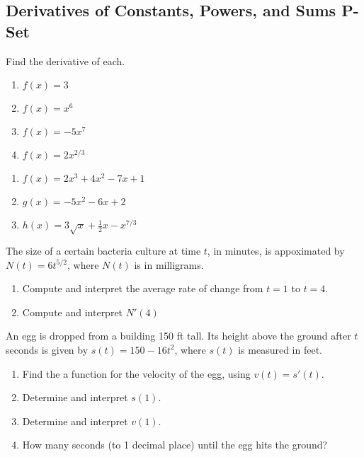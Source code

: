 \documentclass{article}
\newcounter{pset}
\begin{document}
\subsection*{Derivatives of Constants, Powers, and Sums P-Set}

Find the derivative of each.
\begin{multicols}{4}
\begin{enumerate}
    \item $f(x) = 3$
    \item $f(x) = x^6$
    \item $f(x) = -5x^7$
    \item $f(x) = 2x^{2/3}$
\end{enumerate}     \setcounter{pset}{\value{enumi}}
\end{multicols}
\begin{multicols}{3}
\begin{enumerate}   \setcounter{enumi}{\value{pset}}
    \item $f(x) = 2x^3 + 4x^2 - 7x + 1$
    \item $g(x) = -5x^2 - 6x + 2$
    \item $h(x) = 3\sqrt{x} + \frac{1}{2}x - x^{7/3}$
\end{enumerate}     \setcounter{pset}{\value{enumi}}
\end{multicols}

The size of a certain bacteria culture at time $t$, in minutes, is appoximated by $N(t) = 6t^{5/2}$, where $N(t)$ is in milligrams.
\begin{enumerate}   \setcounter{enumi}{\value{pset}}
    \item Compute and interpret the average rate of change from $t=1$ to $t=4$.
    \item Compute and interpret $N'(4)$
\end{enumerate}     \setcounter{pset}{\value{enumi}}

An egg is dropped from a building 150 ft tall. Its height above the ground after $t$ seconds is given by $s(t) = 150 - 16t^2$, where $s(t)$ is measured in feet.
\begin{enumerate}   \setcounter{enumi}{\value{pset}}
    \item Find the a function for the velocity of the egg, using $v(t) = s'(t)$.
    \item Determine and interpret $s(1)$.
    \item Determine and interpret $v(1)$.
    \item How many seconds (to 1 decimal place) until the egg hits the ground?
\end{enumerate}     \setcounter{pset}{\value{enumi}}
\end{document}
